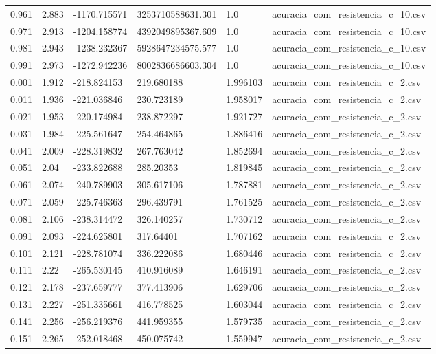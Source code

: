 \begin{table}
\begin{tabular}{llllll}
0.961 & 2.883 & -1170.715571 & 3253710588631.301 & 1.0 & acuracia\_com\_resistencia\_c\_10.csv \\
0.971 & 2.913 & -1204.158774 & 4392049895367.609 & 1.0 & acuracia\_com\_resistencia\_c\_10.csv \\
0.981 & 2.943 & -1238.232367 & 5928647234575.577 & 1.0 & acuracia\_com\_resistencia\_c\_10.csv \\
0.991 & 2.973 & -1272.942236 & 8002836686603.304 & 1.0 & acuracia\_com\_resistencia\_c\_10.csv \\
0.001 & 1.912 & -218.824153 & 219.680188 & 1.996103 & acuracia\_com\_resistencia\_c\_2.csv \\
0.011 & 1.936 & -221.036846 & 230.723189 & 1.958017 & acuracia\_com\_resistencia\_c\_2.csv \\
0.021 & 1.953 & -220.174984 & 238.872297 & 1.921727 & acuracia\_com\_resistencia\_c\_2.csv \\
0.031 & 1.984 & -225.561647 & 254.464865 & 1.886416 & acuracia\_com\_resistencia\_c\_2.csv \\
0.041 & 2.009 & -228.319832 & 267.763042 & 1.852694 & acuracia\_com\_resistencia\_c\_2.csv \\
0.051 & 2.04 & -233.822688 & 285.20353 & 1.819845 & acuracia\_com\_resistencia\_c\_2.csv \\
0.061 & 2.074 & -240.789903 & 305.617106 & 1.787881 & acuracia\_com\_resistencia\_c\_2.csv \\
0.071 & 2.059 & -225.746363 & 296.439791 & 1.761525 & acuracia\_com\_resistencia\_c\_2.csv \\
0.081 & 2.106 & -238.314472 & 326.140257 & 1.730712 & acuracia\_com\_resistencia\_c\_2.csv \\
0.091 & 2.093 & -224.625801 & 317.64401 & 1.707162 & acuracia\_com\_resistencia\_c\_2.csv \\
0.101 & 2.121 & -228.781074 & 336.222086 & 1.680446 & acuracia\_com\_resistencia\_c\_2.csv \\
0.111 & 2.22 & -265.530145 & 410.916089 & 1.646191 & acuracia\_com\_resistencia\_c\_2.csv \\
0.121 & 2.178 & -237.659777 & 377.413906 & 1.629706 & acuracia\_com\_resistencia\_c\_2.csv \\
0.131 & 2.227 & -251.335661 & 416.778525 & 1.603044 & acuracia\_com\_resistencia\_c\_2.csv \\
0.141 & 2.256 & -256.219376 & 441.959355 & 1.579735 & acuracia\_com\_resistencia\_c\_2.csv \\
0.151 & 2.265 & -252.018468 & 450.075742 & 1.559947 & acuracia\_com\_resistencia\_c\_2.csv \\

\end{tabular}
\end{table}
